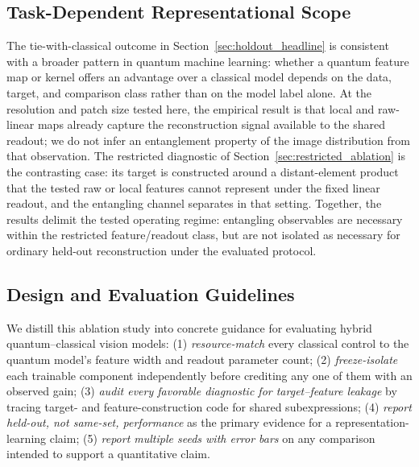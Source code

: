 \documentclass[11pt]{article}
\begin{document}
\subsection{Task-Dependent Representational Scope}
\label{sec:task_dependent}
The tie-with-classical outcome in Section~\ref{sec:holdout_headline} is consistent with a broader pattern in quantum machine learning: whether a quantum feature map or kernel offers an advantage over a classical model depends on the data, target, and comparison class rather than on the model label alone. At the resolution and patch size tested here, the empirical result is that local and raw-linear maps already capture the reconstruction signal available to the shared readout; we do not infer an entanglement property of the image distribution from that observation. The restricted diagnostic of Section~\ref{sec:restricted_ablation} is the contrasting case: its target is constructed around a distant-element product that the tested raw or local features cannot represent under the fixed linear readout, and the entangling channel separates in that setting. Together, the results delimit the tested operating regime: entangling observables are necessary within the restricted feature/readout class, but are not isolated as necessary for ordinary held-out reconstruction under the evaluated protocol.

\subsection{Design and Evaluation Guidelines}
We distill this ablation study into concrete guidance for evaluating hybrid quantum--classical vision models: (1) \emph{resource-match} every classical control to the quantum model's feature width and readout parameter count; (2) \emph{freeze-isolate} each trainable component independently before crediting any one of them with an observed gain; (3) \emph{audit every favorable diagnostic for target--feature leakage} by tracing target- and feature-construction code for shared subexpressions; (4) \emph{report held-out, not same-set, performance} as the primary evidence for a representation-learning claim; (5) \emph{report multiple seeds with error bars} on any comparison intended to support a quantitative claim.
\end{document}
